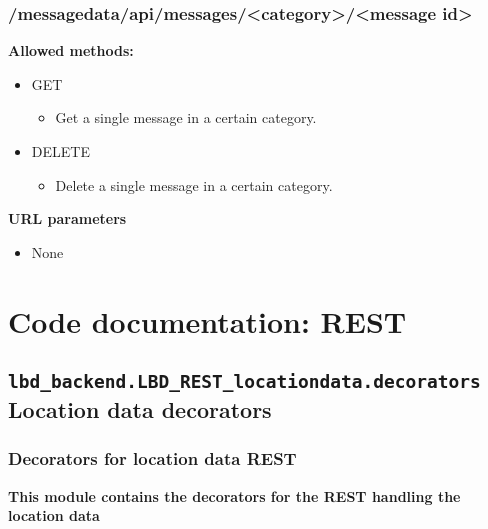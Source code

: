 \documentclass[letterpaper,10pt,english]{sphinxmanual}
\begin{document}
\subsection{/messagedata/api/messages/\textless{}category\textgreater{}/\textless{}message id\textgreater{}}
\label{restdoc:messagedata-api-messages-category-message-id}
\textbf{Allowed methods:}
\begin{itemize}
\item {} 
GET
\begin{itemize}
\item {} 
Get a single message in a certain category.

\end{itemize}

\item {} 
DELETE
\begin{itemize}
\item {} 
Delete a single message in a certain category.

\end{itemize}

\end{itemize}

\textbf{URL parameters}
\begin{itemize}
\item {} 
None

\end{itemize}


\chapter{Code documentation: REST}
\label{codedoc:code-documentation-rest}\label{codedoc::doc}

\section{\texttt{lbd\_backend.LBD\_REST\_locationdata.decorators} Location data decorators}
\label{codedoc/decdoc:module-lbd_backend.LBD_REST_locationdata.decorators}\label{codedoc/decdoc:lbd-backend-lbd-rest-locationdata-decorators-location-data-decorators}\label{codedoc/decdoc::doc}

\subsection{Decorators for location data REST}
\label{codedoc/decdoc:locdecos}\label{codedoc/decdoc:decorators-for-location-data-rest}
\textbf{This module contains the decorators for the REST handling the location data}
\label{codedoc/decdoc:module-LocationdataREST.decorators}
\end{document}
